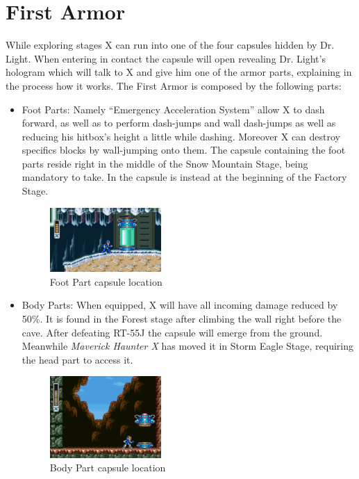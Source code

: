 \section{First Armor}\label{X1:Armor}
While exploring stages X can run into one of the four capsules hidden by Dr. Light. When entering in contact the capsule will open revealing Dr. Light's hologram which will talk to X and give him one of the armor parts\cite{wiki:First_armor}, explaining in the process how it works.
The First Armor is composed by the following parts:
\begin{itemize}
	\item Foot Parts: Namely ``Emergency Acceleration System''\cite{X:Manual} allow X to dash forward, as well as to perform dash-jumps and wall dash-jumps as well as reducing his hitbox's height a little while dashing. Moreover X can destroy specifics blocks by wall-jumping onto them. The capsule containing the foot parts reside right in the middle of the Snow Mountain Stage, being mandatory to take. In \mhx the capsule is instead at the beginning of the Factory Stage.
	\begin{figure}[htp]
		\centering
		\includegraphics[width=0.4\textwidth]{figures/X1/Chill_penguin/Armor_foot.jpg}
		\caption{Foot Part capsule location}
	\end{figure}
	
	\item Body Parts: When equipped, X will have all incoming damage reduced by 50\%. It is found in the Forest stage after climbing the wall right before the cave. After defeating RT-55J the capsule will emerge from the ground. Meanwhile \textit{Maverick Haunter X} has moved it in Storm Eagle Stage, requiring the head part to access it.
	\begin{figure}[hhtp]
		\centering
		\includegraphics[width=0.4\textwidth]{figures/X1/Sting_chameleon/Sting_armor_capsule.jpg}
		\caption{Body Part capsule location}
	\end{figure}
	

\end{itemize}

